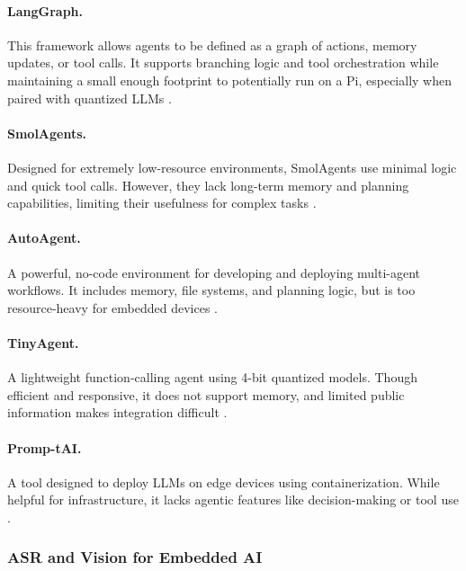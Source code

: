 \paragraph{LangGraph.} This framework allows agents to be defined as a graph of actions, memory updates, or tool calls. It supports branching logic and tool orchestration while maintaining a small enough footprint to potentially run on a Pi, especially when paired with quantized LLMs \cite{langchain2024langgraph,kumari2025smolagents}.

\paragraph{SmolAgents.} Designed for extremely low-resource environments, SmolAgents use minimal logic and quick tool calls. However, they lack long-term memory and planning capabilities, limiting their usefulness for complex tasks \cite{kumari2025smolagents,xi2023rise}.

\paragraph{AutoAgent.} A powerful, no-code environment for developing and deploying multi-agent workflows. It includes memory, file systems, and planning logic, but is too resource-heavy for embedded devices \cite{tang2025autoagent}.

\paragraph{TinyAgent.} A lightweight function-calling agent using 4-bit quantized models. Though efficient and responsive, it does not support memory, and limited public information makes integration difficult \cite{erdogan2024tinyagent}.

\paragraph{Promp-tAI.} A tool designed to deploy LLMs on edge devices using containerization. While helpful for infrastructure, it lacks agentic features like decision-making or tool use \cite{nezami2024promptai}.


\subsubsection{ASR and Vision for Embedded AI}

